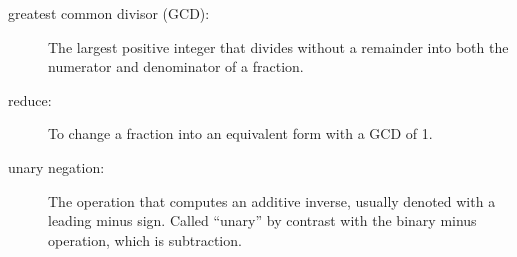 \begin{description}

\item[greatest common divisor (GCD):] The largest positive integer
that divides without a remainder into both the numerator and denominator
of a fraction.

\item[reduce:] To change a fraction into an equivalent form with a
GCD of 1.

\item[unary negation:] The operation that computes an additive
inverse, usually denoted with a leading minus sign.  Called 
``unary'' by contrast with the binary minus operation, which is
subtraction.



\end{description}
